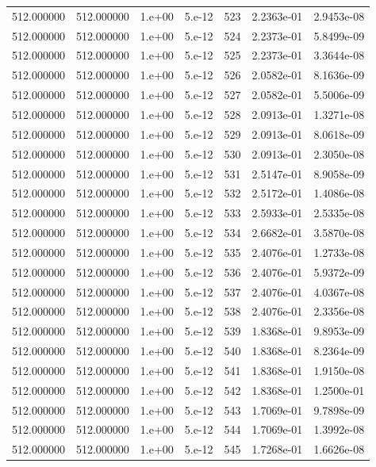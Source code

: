 \begin{table}[htbp]
\begin{tabular}{rrrrrrr}
512.000000 & 512.000000 & 1.e+00 & 5.e-12 & 523 & 2.2363e-01 & 2.9453e-08 \\
512.000000 & 512.000000 & 1.e+00 & 5.e-12 & 524 & 2.2373e-01 & 5.8499e-09 \\
512.000000 & 512.000000 & 1.e+00 & 5.e-12 & 525 & 2.2373e-01 & 3.3644e-08 \\
512.000000 & 512.000000 & 1.e+00 & 5.e-12 & 526 & 2.0582e-01 & 8.1636e-09 \\
512.000000 & 512.000000 & 1.e+00 & 5.e-12 & 527 & 2.0582e-01 & 5.5006e-09 \\
512.000000 & 512.000000 & 1.e+00 & 5.e-12 & 528 & 2.0913e-01 & 1.3271e-08 \\
512.000000 & 512.000000 & 1.e+00 & 5.e-12 & 529 & 2.0913e-01 & 8.0618e-09 \\
512.000000 & 512.000000 & 1.e+00 & 5.e-12 & 530 & 2.0913e-01 & 2.3050e-08 \\
512.000000 & 512.000000 & 1.e+00 & 5.e-12 & 531 & 2.5147e-01 & 8.9058e-09 \\
512.000000 & 512.000000 & 1.e+00 & 5.e-12 & 532 & 2.5172e-01 & 1.4086e-08 \\
512.000000 & 512.000000 & 1.e+00 & 5.e-12 & 533 & 2.5933e-01 & 2.5335e-08 \\
512.000000 & 512.000000 & 1.e+00 & 5.e-12 & 534 & 2.6682e-01 & 3.5870e-08 \\
512.000000 & 512.000000 & 1.e+00 & 5.e-12 & 535 & 2.4076e-01 & 1.2733e-08 \\
512.000000 & 512.000000 & 1.e+00 & 5.e-12 & 536 & 2.4076e-01 & 5.9372e-09 \\
512.000000 & 512.000000 & 1.e+00 & 5.e-12 & 537 & 2.4076e-01 & 4.0367e-08 \\
512.000000 & 512.000000 & 1.e+00 & 5.e-12 & 538 & 2.4076e-01 & 2.3356e-08 \\
512.000000 & 512.000000 & 1.e+00 & 5.e-12 & 539 & 1.8368e-01 & 9.8953e-09 \\
512.000000 & 512.000000 & 1.e+00 & 5.e-12 & 540 & 1.8368e-01 & 8.2364e-09 \\
512.000000 & 512.000000 & 1.e+00 & 5.e-12 & 541 & 1.8368e-01 & 1.9150e-08 \\
512.000000 & 512.000000 & 1.e+00 & 5.e-12 & 542 & 1.8368e-01 & 1.2500e-01 \\
512.000000 & 512.000000 & 1.e+00 & 5.e-12 & 543 & 1.7069e-01 & 9.7898e-09 \\
512.000000 & 512.000000 & 1.e+00 & 5.e-12 & 544 & 1.7069e-01 & 1.3992e-08 \\
512.000000 & 512.000000 & 1.e+00 & 5.e-12 & 545 & 1.7268e-01 & 1.6626e-08 \\

\end{tabular}
\end{table}
